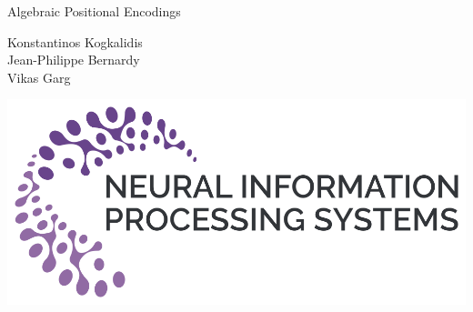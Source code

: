 \documentclass{article}
\newcommand{\titlefont}{\fontsize{55}{55}\selectfont\setlength{\parskip}{1\baselineskip}}
\newcommand{\nfont}{\fontsize{21}{22}\selectfont\setlength{\parskip}{1\baselineskip}}
\begin{document}
	\begin{minipage}{\textwidth}
		\begin{minipage}{0.5\textwidth}
			\titlefont
			Algebraic Positional Encodings
		\end{minipage}%
		\begin{minipage}{0.3\textwidth}
			\nfont
			Konstantinos Kogkalidis\\
			Jean-Philippe Bernardy\\
			Vikas Garg
		\end{minipage}\hfill
		\begin{minipage}{0.15\textwidth}
			\includegraphics[width=\textwidth]{NeurIPS_logo.png}
		\end{minipage}
	\end{minipage}
	\vspace{0.5in}
	
\end{document}
